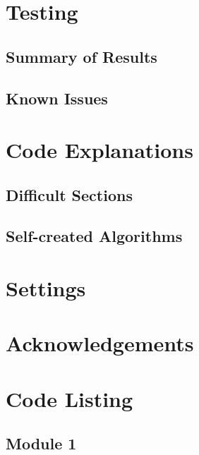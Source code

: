 \section{Testing}

\subsection{Summary of Results}

\subsection{Known Issues}

\section{Code Explanations}

\subsection{Difficult Sections}

\subsection{Self-created Algorithms}

\section{Settings}

\section{Acknowledgements}

\section{Code Listing}
\begin{landscape}
\subsection{Module 1}
\begin{comment}
\pythonfile[firstline=5]{./tex/function_programs/print_function.py}
\end{comment}
\end{landscape}
